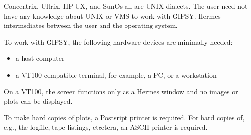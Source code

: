 Concentrix, Ultrix, HP-UX, and SunOs all are UNIX dialects. 
The user need not have any knowledge about UNIX or VMS to work with
GIPSY. Hermes intermediates between the user and the operating system. 

\clearpage


To work with GIPSY, the following hardware devices are minimally needed:

\begin{itemize}

\item a host computer

\item a VT100 compatible terminal, for example, a PC, or a workstation

\end{itemize}

On a VT100, the screen functions only as a Hermes window and no images
or plots can be displayed. 

To make hard copies of plots, a Postsript printer is required.  For hard
copies of, e.g., the logfile, tape listings, etcetera, an ASCII printer
is required. 


\newpage

\listoffigures

\listoftables


